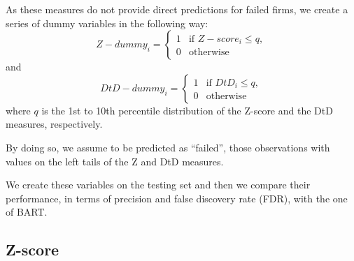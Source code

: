 \documentclass[]{article}
\newenvironment{Shaded}{\begin{snugshade}}{\end{snugshade}}
\newcommand{\KeywordTok}[1]{\textcolor[rgb]{0.13,0.29,0.53}{\textbf{#1}}}
\newcommand{\NormalTok}[1]{#1}
\newcommand{\OperatorTok}[1]{\textcolor[rgb]{0.81,0.36,0.00}{\textbf{#1}}}
\newcommand{\StringTok}[1]{\textcolor[rgb]{0.31,0.60,0.02}{#1}}
\begin{document}
As these measures do not provide direct predictions for failed firms, we
create a series of dummy variables in the following way:
\begin{equation}
        Z-dummy_i=\begin{cases}
        1 &  \text{if $Z-score_i \leq q$}, \nonumber \\
        0 &   \text{otherwise}
        \end{cases}
\end{equation} and \begin{equation}
        DtD-dummy_i=\begin{cases}
        1 &  \text{if $DtD_i \leq q$}, \nonumber \\
        0 &   \text{otherwise}
        \end{cases}
\end{equation} where \(q\) is the 1st to 10th percentile distribution of
the Z-score and the DtD measures, respectively.

By doing so, we assume to be predicted as ``failed'', those observations
with values on the left tails of the Z and DtD measures.

We create these variables on the testing set and then we compare their
performance, in terms of precision and false discovery rate (FDR), with
the one of BART.

\hypertarget{z-score}{%
\subsection{Z-score}\label{z-score}}

\begin{Shaded}
\end{Shaded}
\end{document}
